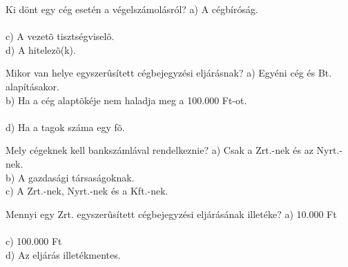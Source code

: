 \begin{frame}

\begin{tcolorbox}[title={98. Kérdés}]
Ki dönt egy cég esetén a végelszámolásról?
\tcblower
a) A cégbíróság.\\
\\
c) A vezetõ tisztségviselõ.\\
d) A hitelezõ(k).
\end{tcolorbox}

\begin{tcolorbox}[title={99. Kérdés}]
Mikor van helye egyszerûsített cégbejegyzési eljárásnak?
\tcblower
a) Egyéni cég és Bt. alapításakor.\\
b) Ha a cég alaptõkéje nem haladja meg a 100.000 Ft-ot.\\
\\
d) Ha a tagok száma egy fõ.
\end{tcolorbox}

\begin{tcolorbox}[title={100. Kérdés}]
Mely cégeknek kell bankszámlával rendelkeznie?
\tcblower
a) Csak a Zrt.-nek és az Nyrt.-nek.\\
b) A gazdasági társaságoknak.\\
c) A Zrt.-nek, Nyrt.-nek és a Kft.-nek.\\
\end{tcolorbox}

\begin{tcolorbox}[title={101. Kérdés}]
Mennyi egy Zrt. egyszerûsített cégbejegyzési eljárásának illetéke?
\tcblower
a) 10.000 Ft\\
\\
c) 100.000 Ft\\
d) Az eljárás illetékmentes.
\end{tcolorbox}

\end{frame}


